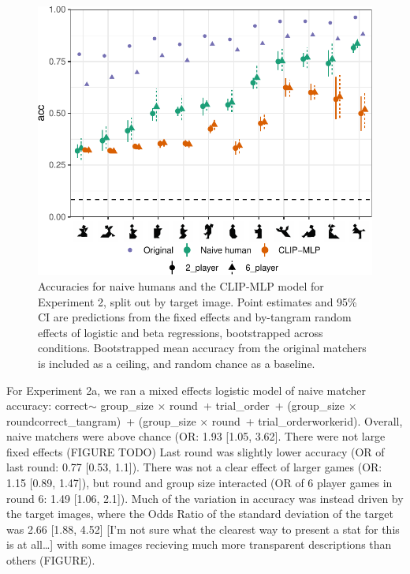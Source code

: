 \documentclass[10pt, letterpaper]{article}
\begin{document}
\begin{CodeChunk}
\begin{figure}[t]

{\centering \includegraphics[width=1\linewidth]{figs/fig-2-1} 

}

\caption[Accuracies for naive humans and the CLIP-MLP model for Experiment 2, split out by target image]{Accuracies for naive humans and the CLIP-MLP model for Experiment 2, split out by target image. Point estimates and 95\% CI are predictions from the fixed effects and by-tangram random effects of logistic and beta regressions, bootstrapped across conditions. Bootstrapped mean accuracy from the original matchers is included as a ceiling, and random chance as a baseline. \label{TODO2}}\label{fig:fig-2}
\end{figure}
\end{CodeChunk}

For Experiment 2a, we ran a mixed effects logistic model of naive
matcher accuracy: correct\(\sim\) group\_size \(\times\) round~+
trial\_order~+ (group\_size \(\times\) round\textbar correct\_tangram)~+
(group\_size \(\times\) round~+ trial\_order\textbar workerid). Overall,
naive matchers were above chance (OR: 1.93 {[}1.05, 3.62{]}. There were
not large fixed effects (FIGURE TODO) Last round was slightly lower
accuracy (OR of last round: 0.77 {[}0.53, 1.1{]}). There was not a clear
effect of larger games (OR: 1.15 {[}0.89, 1.47{]}), but round and group
size interacted (OR of 6 player games in round 6: 1.49 {[}1.06, 2.1{]}).
Much of the variation in accuracy was instead driven by the target
images, where the Odds Ratio of the standard deviation of the target was
2.66 {[}1.88, 4.52{]} {[}I'm not sure what the clearest way to present a
stat for this is at all\ldots{]} with some images recieving much more
transparent descriptions than others (FIGURE).
\end{document}
